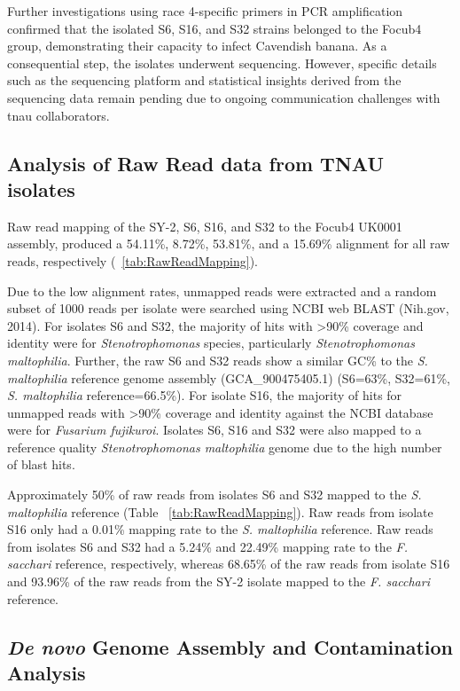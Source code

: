 Further investigations using race 4-specific primers in PCR amplification confirmed that the isolated S6, S16, and S32 strains belonged to the \acs{Focub4} group, demonstrating their capacity to infect Cavendish banana. As a consequential step, the isolates underwent sequencing. However, specific details such as the sequencing platform and statistical insights derived from the sequencing data remain pending due to ongoing communication challenges with \ac{tnau} collaborators.

\subsection{Analysis of Raw Read data from TNAU isolates}

Raw read mapping of the SY-2, S6, S16, and S32 to the \ac{Focub4} UK0001 assembly, produced a 54.11\%, 8.72\%, 53.81\%, and a 15.69\% alignment for all raw reads, respectively (~\ref{tab:RawReadMapping}). 

Due to the low alignment rates, unmapped reads were extracted and a random subset of 1000 reads per isolate were searched using NCBI web BLAST (Nih.gov, 2014). For isolates S6 and S32, the majority of hits with >90\% coverage and identity were for \textit{Stenotrophomonas} species, particularly \textit{Stenotrophomonas maltophilia}. Further, the raw S6 and S32 reads show a similar GC\% to the \textit{S. maltophilia }reference genome assembly (GCA\_900475405.1) (S6=63\%, S32=61\%, \textit{S. maltophilia} reference=66.5\%). For isolate S16, the majority of hits for unmapped reads with >90\% coverage and identity against the NCBI database were for \textit{Fusarium fujikuroi}. Isolates S6, S16 and S32 were also mapped to a reference quality \textit{Stenotrophomonas maltophilia} genome due to the high number of blast hits. 

Approximately 50\% of raw reads from isolates S6 and S32 mapped to the \textit{S. maltophilia} reference (Table ~\ref{tab:RawReadMapping}). Raw reads from isolate S16 only had a 0.01\% mapping rate to the \textit{S. maltophilia} reference. Raw reads from isolates S6 and S32 had a 5.24\% and 22.49\% mapping rate to the \textit{F. sacchari} reference, respectively, whereas 68.65\% of the raw reads from isolate S16 and 93.96\% of the raw reads from the SY-2 isolate mapped to the \textit{F. sacchari} reference.



\subsection{\textit{De novo} Genome Assembly and Contamination Analysis}

